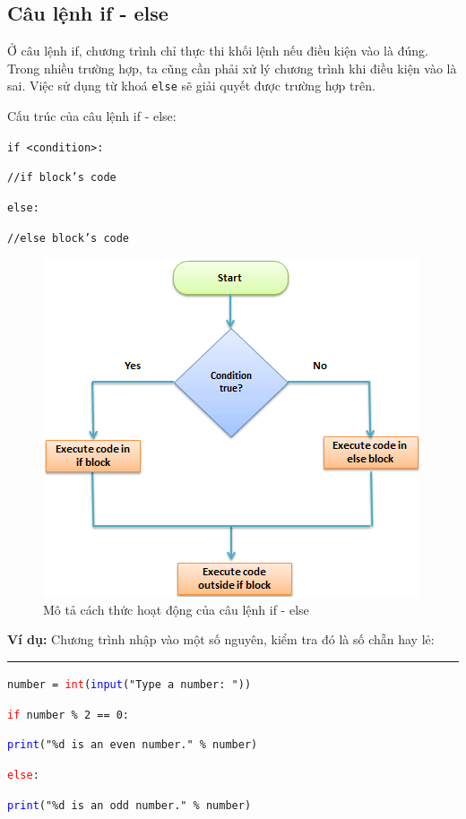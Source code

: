 \subsection{Câu lệnh if - else}
Ở câu lệnh if, chương trình chỉ thực thi khối lệnh nếu điều kiện vào là đúng. Trong nhiều trường hợp, ta cũng cần phải xử lý chương trình khi điều kiện vào là sai. Việc sử dụng từ khoá \texttt{else} sẽ giải quyết được trường hợp trên.\par
Cấu trúc của câu lệnh if - else:\par
\texttt{if <condition>:}\par
\qquad \texttt{//if block's code}\par
\texttt{else:}\par
\qquad \texttt{//else block's code}\par
\begin{figure}[h]
	\centering
	\includegraphics{img/if_else}
	\caption{Mô tả cách thức hoạt động của câu lệnh if - else}
\end{figure}
\newpage
\textbf{Ví dụ:} Chương trình nhập vào một số nguyên, kiểm tra đó là số chẵn hay lẻ:\\
\rule{\linewidth}{0.2mm}\par
\begin{linenumbers}
	\texttt{number = \textcolor{red}{int}(\textcolor{blue}{input}("Type a number: "))}\par
	\texttt{\textcolor{red}{if} number \% 2 == 0:}\par
	\qquad \texttt{\textcolor{blue}{print}("\%d is an even number." \% number)}\par
	\texttt{\textcolor{red}{else}:}\par
	\qquad \texttt{\textcolor{blue}{print}("\%d is an odd number." \% number)}\par
\end{linenumbers}

